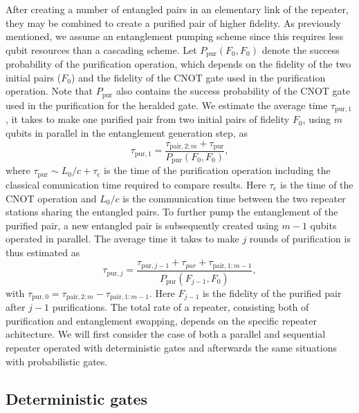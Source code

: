 After creating a number of entangled pairs in an elementary link of the
repeater, they may be combined to create a purified pair of higher fidelity. As
previously mentioned, we assume an entanglement pumping scheme since this
requires less qubit resources than a cascading scheme. Let
$P_{\text{pur}}(F_{0},F_{0})$ denote the success probability of the purification
operation, which depends on the fidelity of the two initial pairs ($F_{0}$) and
the fidelity of the CNOT gate used in the purification operation. Note that
$P_{\text{pur}}$ also contains the success probability of the CNOT gate used in
the purification for the heralded gate. We estimate the average time
$\tau_{\text{pur},1}$, it takes to make one purified pair from two initial pairs
of fidelity $F_{0}$, using $m$ qubits in parallel in the entanglement generation
step, as
\begin{equation}
\tau_{\text{pur},1}=\frac{\tau_{\text{pair},2;m}+\tau_{\text{pur}}}
{P_{\text{pur}}(F_{0},F_{0})},
\end{equation}     
where $\tau_{\text{pur}}\sim L_{0}/c+\tau_{\text{c}}$ is the time of the
purification operation including the classical comunication time required to
compare results. Here $\tau_{\text{c}}$ is the time of the CNOT operation and
$L_{0}/c$  is the communication time between the two repeater stations sharing
the entangled pairs. To further pump the entanglement of the purified pair, a
new entangled pair is subsequently created using $m-1$ qubits operated in
parallel. The average time it takes to make $j$ rounds of purification is thus
estimated as
\begin{equation} \label{eq:pur1}
\tau_{\text{pur},j}=\frac{\tau_{\text{pur},j-1}+
\tau_{pur}+\tau_{\text{pair},1:m-1}}{P_{\text{pur}}(F_{j-1},F_{0})},
\end{equation}
with $\tau_{\text{pur},0}=\tau_{\text{pair},2;m}- \tau_{\text{pair},1:m-1}$.
Here $F_{j-1}$ is the fidelity of the purified pair after $j-1$ purifications.
The total rate of a repeater, consisting both of purification and entanglement
swapping, depends on the specific repeater achitecture. We will first consider
the case of both a parallel and sequential repeater operated with deterministic
gates and afterwards the same situations with probabilistic gates.

\subsection{Deterministic gates}

